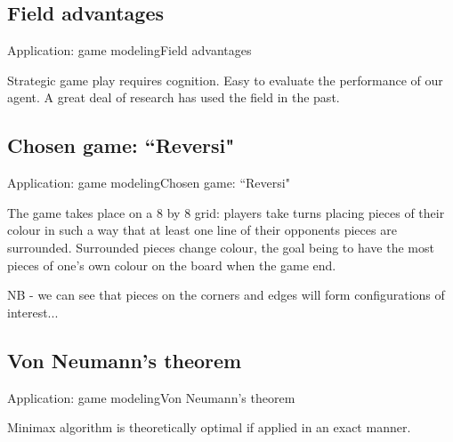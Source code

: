 \subsection{Field advantages}
\begin{frame}{Application: game modeling}{Field advantages}

Strategic game play requires cognition. Easy to evaluate the performance of our 
agent. A great deal of research has used  the field in the past.

\end{frame}

\subsection{Chosen game: ``Reversi"}
\begin{frame}{Application: game modeling}{Chosen game: ``Reversi"}

The game takes place on a 8 by 8 grid: players take turns placing pieces of 
their colour in such a way that at least one line of their opponents pieces are
surrounded. Surrounded pieces change colour, the goal being to have the most 
pieces of one's own colour on the board when the game end.

NB - we can see that pieces on the corners and edges will form configurations of 
interest...

\end{frame}

\subsection{Von Neumann's theorem}
\begin{frame}{Application: game modeling}{Von Neumann's theorem}

Minimax algorithm is theoretically optimal if applied in an exact manner.

\end{frame}

